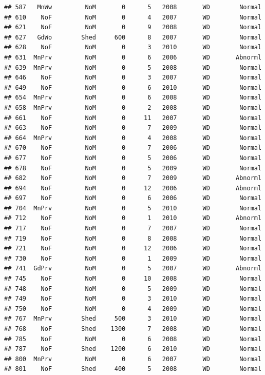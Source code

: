 \documentclass[]{article}
\begin{document}
\begin{verbatim}
## 587   MnWw         NoM       0      5   2008       WD        Normal
## 610    NoF         NoM       0      4   2007       WD        Normal
## 621    NoF         NoM       0      9   2008       WD        Normal
## 627   GdWo        Shed     600      8   2007       WD        Normal
## 628    NoF         NoM       0      3   2010       WD        Normal
## 631  MnPrv         NoM       0      6   2006       WD       Abnorml
## 639  MnPrv         NoM       0      5   2008       WD        Normal
## 646    NoF         NoM       0      3   2007       WD        Normal
## 649    NoF         NoM       0      6   2010       WD        Normal
## 654  MnPrv         NoM       0      6   2008       WD        Normal
## 658  MnPrv         NoM       0      2   2008       WD        Normal
## 661    NoF         NoM       0     11   2007       WD        Normal
## 663    NoF         NoM       0      7   2009       WD        Normal
## 664  MnPrv         NoM       0      4   2008       WD        Normal
## 670    NoF         NoM       0      7   2006       WD        Normal
## 677    NoF         NoM       0      5   2006       WD        Normal
## 678    NoF         NoM       0      5   2009       WD        Normal
## 682    NoF         NoM       0      7   2009       WD       Abnorml
## 694    NoF         NoM       0     12   2006       WD       Abnorml
## 697    NoF         NoM       0      6   2006       WD        Normal
## 704  MnPrv         NoM       0      5   2010       WD        Normal
## 712    NoF         NoM       0      1   2010       WD       Abnorml
## 717    NoF         NoM       0      7   2007       WD        Normal
## 719    NoF         NoM       0      8   2008       WD        Normal
## 721    NoF         NoM       0     12   2006       WD        Normal
## 730    NoF         NoM       0      1   2009       WD        Normal
## 741  GdPrv         NoM       0      5   2007       WD       Abnorml
## 745    NoF         NoM       0     10   2008       WD        Normal
## 748    NoF         NoM       0      5   2009       WD        Normal
## 749    NoF         NoM       0      3   2010       WD        Normal
## 750    NoF         NoM       0      4   2009       WD        Normal
## 767  MnPrv        Shed     500      3   2010       WD        Normal
## 768    NoF        Shed    1300      7   2008       WD        Normal
## 785    NoF         NoM       0      6   2008       WD        Normal
## 787    NoF        Shed    1200      6   2010       WD        Normal
## 800  MnPrv         NoM       0      6   2007       WD        Normal
## 801    NoF        Shed     400      5   2008       WD        Normal

\end{verbatim}
\end{document}
